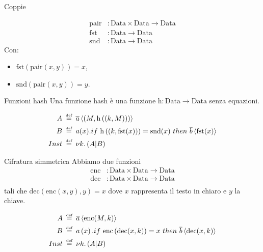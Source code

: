 \documentclass{beamer}
\theoremstyle{plain}
\theoremstyle{definition}
\theoremstyle{remark}
\newcommand{\obar}[1]{\overline{#1}}
\newcommand{\pa}[1]{\left(#1\right)}
\newcommand{\ang}[1]{\left<#1\right>}
\newcommand*{\eqdef}{\ensuremath{\overset{\mathclap{\text{\tiny def}}}{=}}}
\begin{document}
\begin{frame}{Coppie}
  
  \begin{align*}
    \mathrm{pair} &: \mathrm{Data} \times \mathrm{Data} \rightarrow
                    \mathrm{Data} \\
    \mathrm{fst} &: \mathrm{Data} \rightarrow \mathrm{Data} \\
    \mathrm{snd} &: \mathrm{Data} \rightarrow \mathrm{Data}
  \end{align*}
  Con:
  \begin{itemize}
  \item $\mathrm{fst}\pa{\mathrm{pair}(x,y)} = x$,
  \item $\mathrm{snd}\pa{\mathrm{pair}(x,y)} = y$.
  \end{itemize}

\end{frame}

\begin{frame}{Funzioni hash}
  Una funzione hash \`e una funzione $\mathrm{h}: \mathrm{Data}
  \rightarrow \mathrm{Data}$ senza equazioni.
  
  \begin{align*}
    A & \;\eqdef\; \obar{a}\ang{ \pa{M,\mathrm{h}\pa{(k,M)}}} \\
    B & \;\eqdef\; a(x).if\ \mathrm{h}\pa{(k,\mathrm{fst}(x))} =
        \mathrm{snd}(x)\ then\ \obar{b}\ang{\mathrm{fst}(x)} \\
    Inst & \;\eqdef\; \nu k.\pa{ A | B } 
  \end{align*}
\end{frame}

\begin{frame}{Cifratura simmetrica}
  Abbiamo due funzioni
  \begin{align*}
    \mathrm{enc} &: \mathrm{Data} \times \mathrm{Data} \rightarrow
                   \mathrm{Data} \\
    \mathrm{dec} &: \mathrm{Data} \times \mathrm{Data} \rightarrow
                   \mathrm{Data} \\
  \end{align*}
  tali che $\mathrm{dec}\pa{\mathrm{enc}(x,y),y} = x$ dove $x$
  rappresenta il testo in chiaro e $y$ la chiave.
  \vfill
  
  \begin{align*}
    A & \;\eqdef\; \obar{a}\ang{\mathrm{enc}(M,k)} \\
    B & \;\eqdef\; a\pa{x}.if\ \mathrm{enc}\pa{ \mathrm{dec}(x,k)} =
        x\ then\ \obar{b}\ang{\mathrm{dec}(x,k)} \\
    Inst & \;\eqdef\; \nu k. \pa{ A|B}
  \end{align*}
\end{frame}
\end{document}
